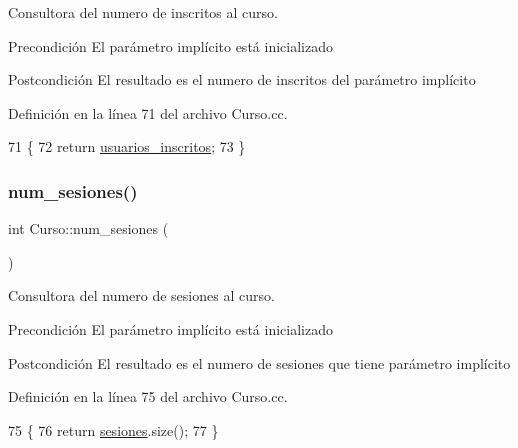 Consultora del numero de inscritos al curso. 

\begin{DoxyPrecond}{Precondición}
El parámetro implícito está inicializado 
\end{DoxyPrecond}
\begin{DoxyPostcond}{Postcondición}
El resultado es el numero de inscritos del parámetro implícito 
\end{DoxyPostcond}


Definición en la línea 71 del archivo Curso.\+cc.


\begin{DoxyCode}
71                          \{
72   \textcolor{keywordflow}{return} \mbox{\hyperlink{class_curso_a94c41191b9cd9dc8af95e7d2560a2381}{usuarios\_inscritos}};
73 \}
\end{DoxyCode}
\mbox{\label{class_curso_a39e86aa0e422cbabb906fcb4878a1a86}} 
\subsubsection{\texorpdfstring{num\+\_\+sesiones()}{num\_sesiones()}}
{\footnotesize\ttfamily int Curso\+::num\+\_\+sesiones (\begin{DoxyParamCaption}{ }\end{DoxyParamCaption})}



Consultora del numero de sesiones al curso. 

\begin{DoxyPrecond}{Precondición}
El parámetro implícito está inicializado 
\end{DoxyPrecond}
\begin{DoxyPostcond}{Postcondición}
El resultado es el numero de sesiones que tiene parámetro implícito 
\end{DoxyPostcond}


Definición en la línea 75 del archivo Curso.\+cc.


\begin{DoxyCode}
75                         \{
76   \textcolor{keywordflow}{return} \mbox{\hyperlink{class_curso_a53e0e57eb6d683a83752082d633a03bc}{sesiones}}.size();
77 \}
\end{DoxyCode}
\mbox{\label{class_curso_a85eb71e4b4a6013526f8afbb1466c2e2}} 
